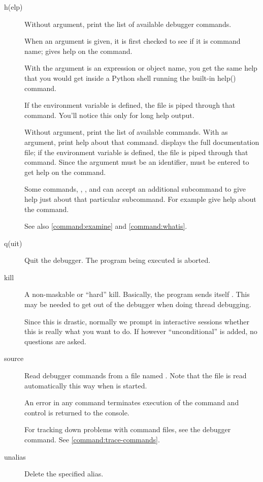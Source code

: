 \begin{description}
\item[h(elp) ]

Without argument, print the list of available debugger commands.

When an argument is given, it is first checked to see if it is command
name;  gives help on the \samp{!} command.

With the argument is an expression or object name, you get the same
help that you would get inside a Python shell running the built-in
help() command.

If the environment variable  is defined, the file is
piped through that command.  You'll notice this only for long help
output.

Without argument, print the list of available commands.  With
 as argument, print help about that command.   displays the full documentation file; if the environment
variable  is defined, the file is piped through that
command.  Since the  argument must be an identifier,
 must be entered to get help on the \samp{!} command.

Some commands, , , and  can accept an
additional subcommand to give help just about that particular
subcommand. For example  give help about the
 command.

See also \ref{command:examine} and \ref{command:whatis}.

\item[q(uit)]\label{command:quit}

Quit the debugger. The program being executed is aborted.

\item[kill ]\label{command:kill}

A non-maskable or ``hard'' kill. Basically, the program sends itself
. This may be needed to get out of the debugger when
doing thread debugging.

Since this is drastic, normally we prompt in interactive sessions
whether this is really what you want to do. If however
``unconditional'' is added, no questions are asked.

\item[source ]\label{command:source}

Read debugger commands from a file named .
Note that the file  is read automatically
this way when  is started.

An error in any command terminates execution of the command and
control is returned to the console.

For tracking down problems with command files, see the  debugger command. See \ref{command:trace-commands}. 

\item[unalias ]\label{command:unalias}

Delete the specified alias.

\end{description}

